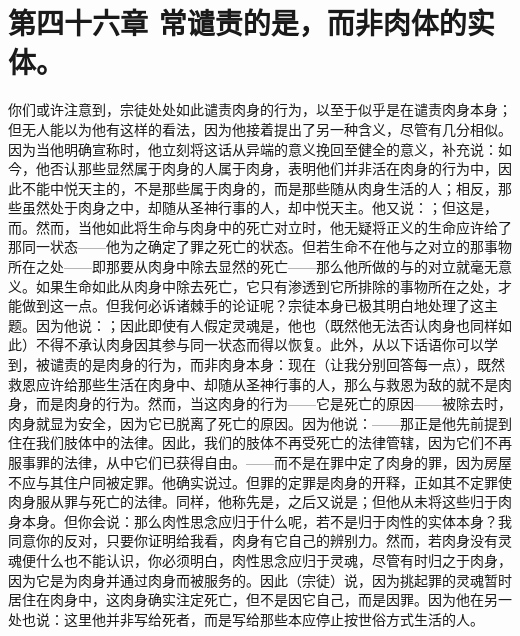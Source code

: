 
\section{第四十六章 常谴责的是，而非肉体的实体。}

你们或许注意到，宗徒处处如此谴责肉身的行为，以至于似乎是在谴责肉身本身；但无人能以为他有这样的看法，因为他接着提出了另一种含义，尽管有几分相似。因为当他明确宣称时，他立刻将这话从异端的意义挽回至健全的意义，补充说：如今，他否认那些显然属于肉身的人属于肉身，表明他们并非活在肉身的行为中，因此不能中悦天主的，不是那些属于肉身的，而是那些随从肉身生活的人；相反，那些虽然处于肉身之中，却随从圣神行事的人，却中悦天主。他又说：；但这是，而。然而，当他如此将生命与肉身中的死亡对立时，他无疑将正义的生命应许给了那同一状态——他为之确定了罪之死亡的状态。但若生命不在他与之对立的那事物所在之处——即那要从肉身中除去显然的死亡——那么他所做的与的对立就毫无意义。如果生命如此从肉身中除去死亡，它只有渗透到它所排除的事物所在之处，才能做到这一点。但我何必诉诸棘手的论证呢？宗徒本身已极其明白地处理了这主题。因为他说：；因此即使有人假定灵魂是，他也（既然他无法否认肉身也同样如此）不得不承认肉身因其参与同一状态而得以恢复。此外，从以下话语你可以学到，被谴责的是肉身的行为，而非肉身本身：现在（让我分别回答每一点），既然救恩应许给那些生活在肉身中、却随从圣神行事的人，那么与救恩为敌的就不是肉身，而是肉身的行为。然而，当这肉身的行为——它是死亡的原因——被除去时，肉身就显为安全，因为它已脱离了死亡的原因。因为他说：——那正是他先前提到住在我们肢体中的法律。因此，我们的肢体不再受死亡的法律管辖，因为它们不再服事罪的法律，从中它们已获得自由。——而不是在罪中定了肉身的罪，因为房屋不应与其住户同被定罪。他确实说过。但罪的定罪是肉身的开释，正如其不定罪使肉身服从罪与死亡的法律。同样，他称先是，之后又说是；但他从未将这些归于肉身本身。但你会说：那么肉性思念应归于什么呢，若不是归于肉性的实体本身？我同意你的反对，只要你证明给我看，肉身有它自己的辨别力。然而，若肉身没有灵魂便什么也不能认识，你必须明白，肉性思念应归于灵魂，尽管有时归之于肉身，因为它是为肉身并通过肉身而被服务的。因此（宗徒）说，因为挑起罪的灵魂暂时居住在肉身中，这肉身确实注定死亡，但不是因它自己，而是因罪。因为他在另一处也说：这里他并非写给死者，而是写给那些本应停止按世俗方式生活的人。\par


